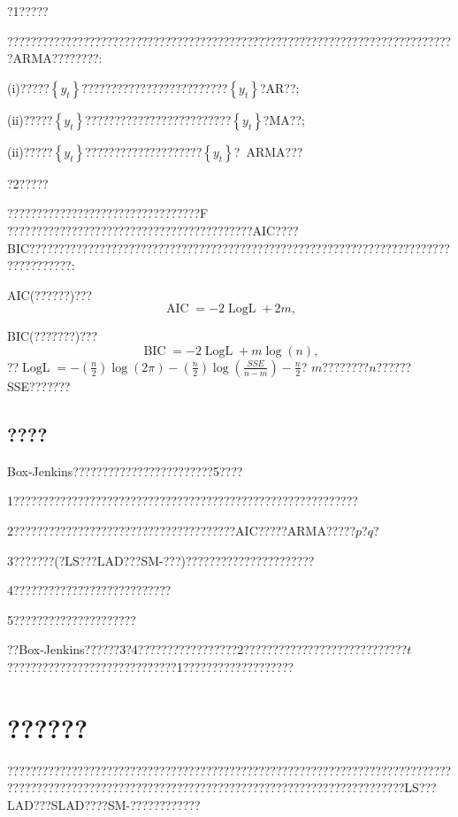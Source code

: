 \documentclass[a4paper,12pt,openany,oneside,utf-8]{ctexbook}
\begin{document}
	?1?????
	
	?????????????????????????????????????????????????????????????????????????????ARMA????????:
	
	(i)?????$\left\{y_t\right\}$?????????????????????????$\left\{y_t\right\}$?AR??;
	
	(ii)?????$\left\{y_t\right\}$?????????????????????????$\left\{y_t\right\}$?MA??;
	
	(ii)?????$\left\{y_t\right\}$????????????????????$\left\{y_t\right\}$?~ARMA???
	
	?2?????
	
	?????????????????????????????????F ??????????????????????????????????????????AIC????BIC???????????????????????????????????????????????????????????????????????????????????:
	
	AIC(??????)???
	\begin{equation}\label{202}
		\operatorname{AIC}=-2\operatorname{LogL}+2m,
	\end{equation}
	
	BIC(???????)???
	\begin{equation}\label{203}
		\operatorname{BIC}=-2\operatorname{LogL}+m\log(n),
	\end{equation}
	??$\operatorname{LogL}=-\left(\frac{n}{2}\right) \log (2 \pi)-\left(\frac{n}{2}\right)  \log \left(\frac{S S E}{n-m}\right)-\frac{n}{2}$?
	$m$????????$n$??????SSE???????
	
	\subsection{????}
	
	Box-Jenkins????????????????????????5????
	
	1???????????????????????????????????????????????????????????
	
	2??????????????????????????????????????AIC?????ARMA?????$p$?$q$?
	
	3???????(?LS???LAD???SM-???)??????????????????????
	
	4???????????????????????????
	
	5?????????????????????
	
	??Box-Jenkins??????3?4?????????????????2????????????????????????????$t$?????????????????????????????1???????????????????
	
	\section{??????}
	
	????????????????????????????????????????????????????????????????????????????????????????????????????????????????????????????????????????????????LS???LAD???SLAD????SM-????????????
	
\end{document}
